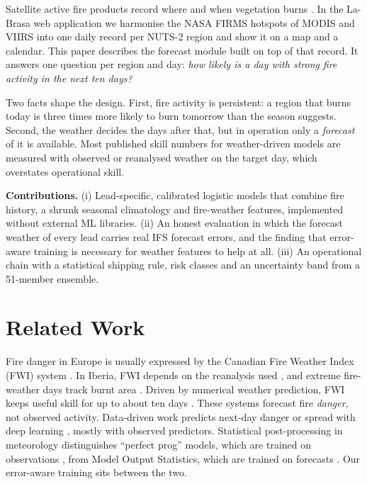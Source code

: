 \documentclass[conference,a4paper]{IEEEtran}
\begin{document}
Satellite active fire products record where and when vegetation burns \cite{schroeder2014,giglio2016}. In the La-Brasa
web application we harmonise the NASA FIRMS hotspots of MODIS and VIIRS \cite{firms} into one daily record per NUTS-2
region and show it on a map and a calendar. This paper describes the forecast module built on top of that record. It
answers one question per region and day: \emph{how likely is a day with strong fire activity in the next ten days?}

Two facts shape the design. First, fire activity is persistent: a region that burns today is three times more likely to
burn tomorrow than the season suggests. Second, the weather decides the days after that, but in operation only a
\emph{forecast} of it is available. Most published skill numbers for weather-driven models are measured with observed
or reanalysed weather on the target day, which overstates operational skill.

\textbf{Contributions.} (i) Lead-specific, calibrated logistic models that combine fire history, a shrunk seasonal
climatology and fire-weather features, implemented without external ML libraries. (ii) An honest evaluation in which
the forecast weather of every lead carries real IFS forecast errors, and the finding that error-aware training is
necessary for weather features to help at all. (iii) An operational chain with a statistical shipping rule, risk
classes and an uncertainty band from a 51-member ensemble.

\section{Related Work}

Fire danger in Europe is usually expressed by the Canadian Fire Weather Index (FWI) system
\cite{vanwagner1985,vanwagner1987}. In Iberia, FWI depends on the reanalysis used \cite{bedia2012}, and extreme
fire-weather days track burnt area \cite{calheiros2020}. Driven by numerical weather prediction, FWI keeps useful skill
for up to about ten days \cite{digiuseppe2016,digiuseppe2020}. These systems forecast fire \emph{danger}, not observed
activity. Data-driven work predicts next-day danger or spread with deep learning
\cite{kondylatos2022,kondylatos2023,huot2022}, mostly with observed predictors. Statistical post-processing in
meteorology distinguishes ``perfect prog'' models, which are trained on observations \cite{klein1959}, from Model Output
Statistics, which are trained on forecasts \cite{glahn1972}. Our error-aware training sits between the two.
\end{document}
